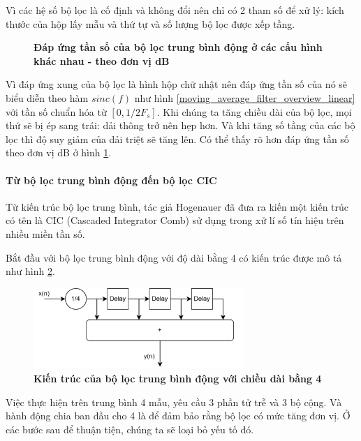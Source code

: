 Vì các hệ số bộ lọc là cố định và không đổi nên chỉ có 2 tham số để xử lý: kích thước của hộp lấy mẫu và thứ tự và số lượng bộ lọc được xếp tầng.
\begin{figure}[H]
    \centering
    
    \caption[Đáp ứng tần số của bộ lọc trung bình động ở các cấu hình khác nhau - theo đơn vị dB]{\bfseries \fontsize{12pt}{0pt}\selectfont Đáp ứng tần số của bộ lọc trung bình động ở các cấu hình khác nhau - theo đơn vị dB}
    \label{moving_average_filter_overview}
\end{figure}
Vì đáp ứng xung của bộ lọc là hình hộp chữ nhật nên đáp ứng tần số của nó sẽ biểu diễn theo hàm $sinc(f)$ như hình \ref{moving_average_filter_overview_linear} với tần số chuẩn hóa từ $[0, 1/2 F_s]$. Khi chúng ta tăng chiều dài của bộ lọc, mọi thứ sẽ bị ép sang trái: dải thông trở nên hẹp hơn. Và khi tăng số tầng của các bộ lọc thì độ suy giảm của dải triệt sẽ tăng lên. Có thể thấy rõ hơn đáp ứng tần số theo đơn vị dB ở hình \ref{moving_average_filter_overview}.

\paragraph{Từ bộ lọc trung bình động đến bộ lọc CIC}
Từ kiến trúc bộ lọc trung bình, tác giả Hogenauer đã đưa ra kiến một kiến trúc có tên là CIC (Cascaded Integrator Comb) sử dụng trong xử lí số tín hiệu trên nhiều miền tần số\cite{CIC}.

Bắt đầu với bộ lọc trung bình động với độ dài bằng 4 có kiến trúc được mô tả như hình \ref{cic_1}.
\begin{figure}[H]
    \centering
    \includegraphics[width=8cm]{Images/Chuong2/cic/cic_1.png}
    \caption[Kiến trúc của bộ lọc trung bình động với chiều dài bằng 4]{\bfseries \fontsize{12pt}{0pt}\selectfont Kiến trúc của bộ lọc trung bình động với chiều dài bằng 4}
    \label{cic_1}
\end{figure}

Việc thực hiện trên trung bình 4 mẫu, yêu cầu 3 phần tử trễ và 3 bộ cộng. Và hành động chia ban đầu cho 4 là để đảm bảo rằng bộ lọc có mức tăng đơn vị. Ở các bước sau để thuận tiện, chúng ta sẽ loại bỏ yếu tố đó.

